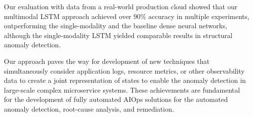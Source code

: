 Our evaluation with data from a real-world production cloud showed that our multimodal LSTM  approach achieved over 90\% accuracy in multiple experiments, outperforming the single-modality and the baseline dense neural networks, although the single-modality LSTM yielded comparable results in structural anomaly detection.

Our approach paves the way for development of new techniques that simultaneously consider application logs, resource metrics, or other observability data to create a joint representation of states to enable the anomaly detection in large-scale complex microservice systems. These achievements are fundamental for the development of fully automated AIOps solutions for the automated anomaly detection, root-cause analysis, and remediation.